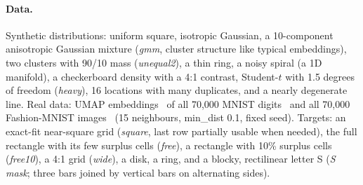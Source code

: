 \paragraph{Data.} Synthetic distributions: uniform square, isotropic Gaussian, a 10-component
anisotropic Gaussian mixture (\emph{gmm}, cluster structure like typical embeddings),
two clusters with 90/10 mass (\emph{unequal2}), a thin ring, a noisy spiral (a 1D
manifold), a checkerboard density with a 4:1 contrast, Student-$t$ with 1.5 degrees of
freedom (\emph{heavy}), 16 locations with many duplicates, and a nearly degenerate line.
Real data: UMAP embeddings~\citep{mcinnes2018umapjoss} of all
70{,}000 MNIST digits~\citep{lecun1998gradient} and all 70{,}000 Fashion-MNIST
images~\citep{xiao2017fashion} (15 neighbours, min\_dist 0.1, fixed seed). Targets: an
exact-fit near-square grid (\emph{square}, last row partially usable when needed), the
full rectangle with its few surplus cells (\emph{free}), a rectangle with 10\% surplus
cells (\emph{free10}), a 4:1 grid (\emph{wide}), a disk, a ring, and a blocky, rectilinear letter S
(\emph{S mask}; three bars joined by vertical bars on alternating sides).

